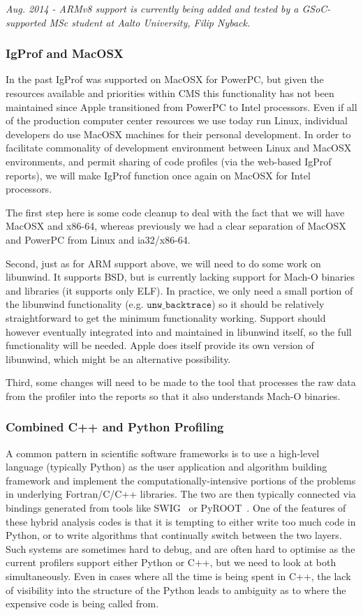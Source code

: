 \documentclass[notitlepage,letter,12pt]{article}
\begin{document}
{\it Aug. 2014 - ARMv8 support is currently being added and tested by 
a GSoC-supported MSc student at Aalto University, Filip Nyback.}

\subsubsection{IgProf and MacOSX}

In the past IgProf was supported on MacOSX for PowerPC, but given
the resources available and priorities within CMS this functionality has not 
been maintained since Apple transitioned from PowerPC to Intel processors. 
Even if all of the production computer center resources we use today
run Linux, individual developers do use MacOSX machines for their
personal development. In order to facilitate commonality of development
environment between Linux and MacOSX environments, and permit sharing
of code profiles (via the web-based IgProf reports), we will make IgProf
function once again on MacOSX for Intel processors.

The first step here is some code cleanup to deal with the fact that
we will have MacOSX and x86-64, whereas previously we had a clear
separation of MacOSX and PowerPC from Linux and ia32/x86-64.

Second, just as for ARM support above, we will need to do some work
on libunwind. It supports BSD, but is currently lacking support for
Mach-O binaries and libraries (it supports only ELF). In practice,
we only need a small portion of the libunwind functionality (e.g.
$\texttt{unw\_backtrace}$) so it should be relatively straightforward
to get the minimum functionality working. Support should however
eventually integrated into and maintained in libunwind itself, so
the full functionality will be needed. Apple does itself provide its
own version of libunwind, which might be an alternative possibility.

Third, some changes will need to be made to the tool that processes
the raw data from the profiler into the reports so that it also
understands Mach-O binaries.


\subsubsection{Combined C++ and Python Profiling}

A common pattern in scientific software frameworks is to use a
high-level language (typically Python) as the user application and
algorithm building framework and implement the computationally-intensive
portions of the problems in underlying Fortran/C/C++ libraries. The
two are then typically connected via bindings generated from tools
like SWIG~\cite{SWIG} or PyROOT~\cite{PYROOT}. One of the features of these 
hybrid analysis codes is that it is tempting to either write too much code
in Python, or to write
algorithms that continually switch between the two layers.  Such
systems are sometimes hard to debug, and are often hard to optimise
as the current profilers support either Python or C++, but we need
to look at both simultaneously.  Even in cases where all the time
is being spent in C++, the lack of visibility into the structure
of the Python leads to ambiguity as to where the expensive code is
being called from.
\end{document}
